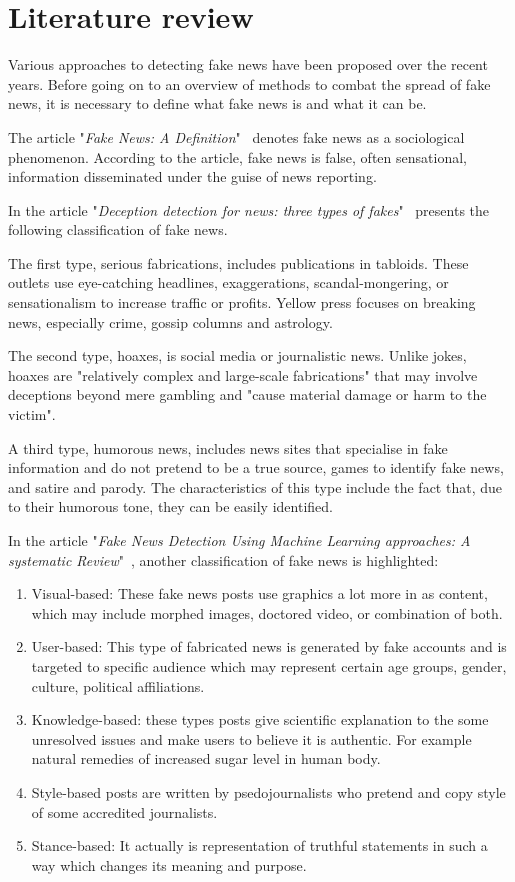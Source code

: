 \newpage
\section{Literature review}\label{sec:lit_rev}

Various approaches to detecting fake news have been proposed over the recent years.
Before going on to an overview of methods to combat the spread of fake news, it is necessary to define what fake news is and what it can be.

The article "\textit{Fake News: A Definition}"~\cite{0} denotes fake news as a sociological phenomenon.
According to the article, fake news is false, often sensational, information disseminated under the guise of news reporting.

In the article "\textit{Deception detection for news: three types of fakes}"~\cite{1} presents the following classification of fake news.

The first type, serious fabrications, includes publications in tabloids.
These outlets use eye-catching headlines, exaggerations, scandal-mongering, or sensationalism to increase traffic or profits.
Yellow press focuses on breaking news, especially crime, gossip columns and astrology.

The second type, hoaxes, is social media or journalistic news.
Unlike jokes, hoaxes are "relatively complex and large-scale fabrications" that may involve deceptions beyond mere gambling and "cause material damage or harm to the victim".

A third type, humorous news, includes news sites that specialise in fake information and do not pretend to be a true source, games to identify fake news, and satire and parody.
The characteristics of this type include the fact that, due to their humorous tone, they can be easily identified.

In the article "\textit{Fake News Detection Using Machine Learning approaches: A systematic Review}"~\cite{2}, another classification of fake news is highlighted:

\begin{enumerate}
    \item Visual-based: These fake news posts use graphics a lot more in as content, which may include morphed images, doctored video, or combination of both.
    \item User-based: This type of fabricated news is generated by fake accounts and is targeted to specific audience which may represent certain age groups, gender, culture, political affiliations.
    \item Knowledge-based: these types posts give scientific explanation to the some unresolved issues and make users to believe it is authentic.
    For example natural remedies of increased sugar level in human body.
    \item Style-based posts are written by psedojournalists who pretend and copy style of some accredited journalists.
    \item Stance-based: It actually is representation of truthful statements in such a way which changes its meaning and purpose.
\end{enumerate}

